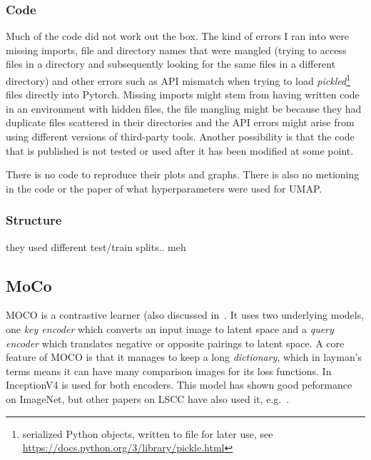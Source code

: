 \documentclass[10pt,twocolumn,letterpaper]{article}
\begin{document}
\subsubsection{Code}\label{subsubsec:code}
Much of the code did not work out the box. The kind of errors I ran into were missing imports, file and directory names that were mangled (trying to access files in a directory and subsequently looking for the same files in a different directory) and other errors such as API mismatch when trying to load \textit{pickled}\footnote{serialized Python objects, written to file for later use, see \href{https://docs.python.org/3/library/pickle.html}{https://docs.python.org/3/library/pickle.html}} files directly into Pytorch. Missing imports might stem from having written code in an environment with hidden files, the file mangling might be because they had duplicate files scattered in their directories and the API errors might arise from using different versions of third-party tools. Another possibility is that the code that is published is not tested or used after it has been modified at some point. 

There is no code to reproduce their plots and graphs. There is also no metioning in the code or the paper of what hyperparameters were used for \gls{UMAP}. 



\subsubsection{Structure}\label{subsubsec:misconception}
they used different test/train splits.. meh

\subsection{MoCo}\label{subsec:moco}
\gls{MOCO}\cite{moco} is a contrastive learner (also discussed in~. It uses two underlying models, one \textit{key encoder} which converts an input image to latent space and a \textit{query encoder} which translates negative or opposite pairings to latent space. A core feature of \gls{MOCO} is that it manages to keep a long \textit{dictionary}, which in layman's terms means it can have many comparison images for its loss functions. In~\cite{sslUMAP} InceptionV4\cite{inceptionV4} is used for both encoders. This model has shown good peformance on ImageNet, but other papers on \gls{LSCC} have also used it, e.g.~\cite{otherInception}.
\end{document}
